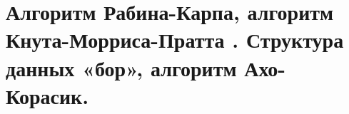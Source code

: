 \section{Алгоритм Рабина-Карпа, алгоритм Кнута-Морриса-Пратта .  Структура данных «бор», алгоритм Ахо-Корасик.  }